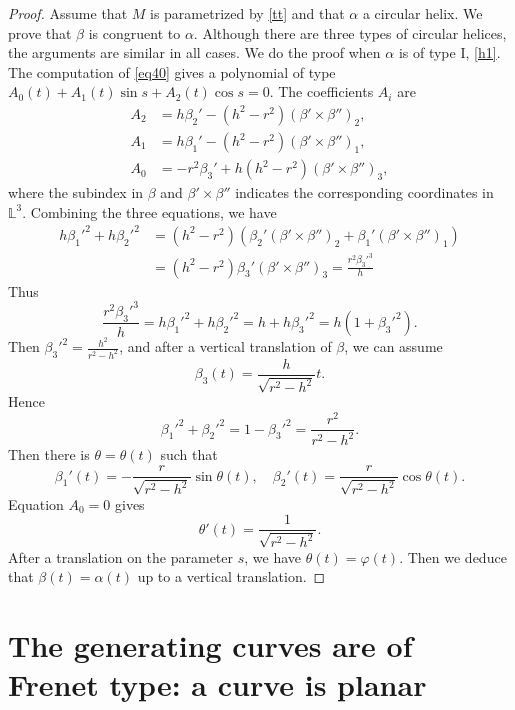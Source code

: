 \documentclass[a4paper,12pt]{amsart}
\numberwithin{equation}{section}
\theoremstyle{definition}
\def\rr{\mathbb L}
\begin{document}
\begin{proof} Assume that $M$ is parametrized by \eqref{tt} and that   $\alpha$   a circular helix. We prove that $\beta$ is congruent to $\alpha$.  Although there are three types of circular helices,  the arguments are similar in all cases. We do the proof when   $\alpha$ is   of type I,   \eqref{h1}.   The computation of \eqref{eq40} gives a polynomial of type $A_0(t)+A_1(t)\sin s+A_2(t)\cos s=0$. The coefficients $A_i$ are
\begin{equation*}
\begin{split}
A_2&=h\beta_2'-(h^2-r^2)(\beta'\times\beta'')_2,\\
A_1&=h\beta_1'-(h^2-r^2)(\beta'\times\beta'')_1,\\
A_0&=-r^2\beta_3'+h(h^2-r^2)(\beta'\times\beta'')_3,
\end{split}
\end{equation*}
where the subindex in $\beta$ and $\beta'\times\beta''$ indicates the corresponding coordinates in  $\rr^3$. Combining the three equations, we have
\begin{equation*}
\begin{split}
h\beta_1'^2+h\beta_2'^2&=(h^2-r^2)(\beta_2'(\beta'\times\beta'')_2+\beta_1'(\beta'\times\beta'')_1)\\
&=(h^2-r^2)\beta_3'(\beta'\times\beta'')_3= \frac{r^2\beta_3'^3}{h}
\end{split}
\end{equation*}
Thus
$$\frac{r^2\beta_3'^3}{h}=h\beta_1'^2+h\beta_2'^2=h+h\beta_3'^2=h(1+\beta_3'^2).$$
 Then $\beta_3'^2=\frac{h^2}{r^2-h^2}$, and after a vertical translation of $\beta$, we can assume 
 $$\beta_3(t)=\frac{h}{\sqrt{r^2-h^2}}t.$$
 Hence
 $$\beta_1'^2+\beta_2'^2=1-\beta_3'^2= \frac{r^2}{r^2-h^2}.$$
 Then there is $\theta=\theta(t)$ such that 
 $$\beta_1'(t)=-\frac{r}{\sqrt{r^2-h^2}}\sin\theta(t),\quad \beta_2'(t)=\frac{r}{\sqrt{r^2-h^2}}\cos\theta(t).$$
 Equation $A_0=0$ gives 
 $$\theta'(t)=\frac{1}{\sqrt{r^2-h^2}}.$$
 After a translation on the parameter $s$, we have $\theta(t)=\varphi(t)$. Then we deduce that $\beta(t)=\alpha(t)$ up to a vertical translation.
 
\end{proof}


 \section{The generating curves are of Frenet type: a curve is planar}\label{s5}
 
\end{document}
